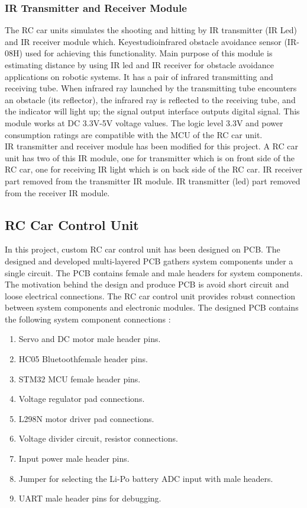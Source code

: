 \subsubsection{IR Transmitter and Receiver Module}
The RC car units simulates the shooting and hitting by IR transmitter (IR Led) and IR receiver module which. Keyestudio\texttrademark\;infrared obstacle avoidance sensor (IR-08H) used for achieving this functionality. Main purpose of this module is estimating distance by using IR led and IR receiver for obstacle avoidance applications on robotic systems. It has a pair of infrared transmitting and receiving tube. When infrared ray launched by the transmitting tube encounters an obstacle (its reflector), the infrared ray is reflected to the receiving tube, and the indicator will light up; the signal output interface outputs digital signal. This module works at DC 3.3V-5V voltage values. The logic level 3.3V and power consumption ratings are compatible with the MCU of the RC car unit.\\

IR transmitter and receiver module has been modified for this project. A RC car unit has two of this IR module, one for transmitter which is on front side of the RC car, one for receiving IR light which is on back side of the RC car. IR receiver part removed from the transmitter IR module. IR transmitter (led) part removed from the receiver IR module. 


\subsection{RC Car Control Unit}
In this project, custom RC car control unit has been designed on PCB. The designed and developed multi-layered PCB gathers system components under a single circuit. The PCB contains female and male headers for system components. The motivation behind the design and produce PCB is avoid short circuit and loose electrical connections. The RC car control unit provides robust connection between system components and electronic modules. The designed PCB contains the following system component connections :
\begin{enumerate}
    \item Servo and DC motor male header pins.
    \item HC05 Bluetooth\texttrademark\;female header pins.
    \item STM32 MCU female header pins.
    \item Voltage regulator pad connections.
    \item L298N motor driver pad connections.
    \item Voltage divider circuit, resistor connections.
    \item Input power male header pins.
    \item Jumper for selecting the Li-Po battery ADC input with male headers.
    \item UART male header pins for debugging.
\end{enumerate}



